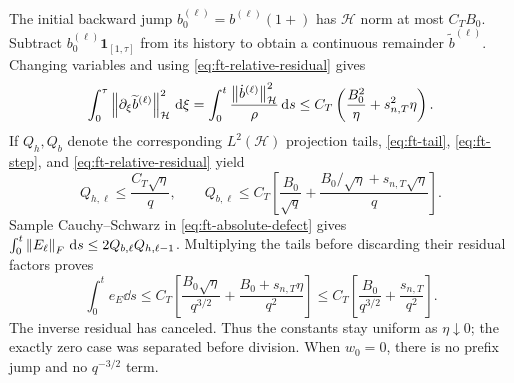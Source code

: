 The initial backward jump $b_0^{(\ell)}=b^{(\ell)}(1+)$ has
$\mathcal H$ norm at most $C_TB_0$.  Subtract
$b_0^{(\ell)}\mathbf1_{[1,\tau]}$ from its history to obtain a continuous
remainder $\widetilde b^{(\ell)}$.
Changing variables and using \eqref{eq:ft-relative-residual} gives
\[
 \int_0^\tau\left\lVert \partial_\xi\widetilde b^{(\ell)}\right\rVert_{\mathcal H}^2\,\mathrm{d}\xi
 =\int_0^t\frac{\left\lVert \dot b^{(\ell)}\right\rVert_{\mathcal H}^2}{\rho}\,\mathrm{d} s
 \le C_T\left(\frac{B_0^2}{\eta}+s_{n,T}^2\eta\right).
\]
If $Q_h,Q_b$ denote the corresponding $L^2(\mathcal H)$ projection
tails, \eqref{eq:ft-tail}, \eqref{eq:ft-step}, and
\eqref{eq:ft-relative-residual} yield
\[
 Q_{h,\ell}\le\frac{C_T\sqrt\eta}{q},\qquad
 Q_{b,\ell}\le C_T\left[
    \frac{B_0}{\sqrt q}
       +\frac{B_0/\sqrt\eta+s_{n,T}\sqrt\eta}{q}\right].
\]
Sample Cauchy--Schwarz in \eqref{eq:ft-absolute-defect} gives
$\int_0^t\left\lVert E_\ell\right\rVert_F\,\mathrm{d} s\le2Q_{b,\ell}Q_{h,\ell-1}$.
Multiplying the tails before discarding their residual factors proves
\begin{equation}
 \int_0^t e_E\dd s
 \le C_T\left[\frac{B_0\sqrt\eta}{q^{3/2}}
                      +\frac{B_0+s_{n,T}\eta}{q^2}\right]
 \le C_T\left[\frac{B_0}{q^{3/2}}+\frac{s_{n,T}}{q^2}\right].
 \label{eq:ft-source}
\end{equation}
The inverse residual has canceled.  Thus the constants stay uniform as
$\eta\downarrow0$; the exactly zero case was separated before division.
When $w_0=0$, there is no prefix jump and no $q^{-3/2}$ term.

